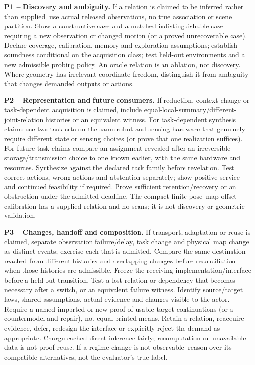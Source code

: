 \documentclass[11pt,letterpaper]{article}
\newcommand{\status}[1]{\textbf{#1.}}
\begin{document}
\status{P1 -- Discovery and ambiguity} If a relation is claimed to be inferred rather than supplied, use actual released observations, no true association or scene partition. Show a constructive case and a matched indistinguishable case requiring a new observation or changed motion (or a proved unrecoverable case). Declare coverage, calibration, memory and exploration assumptions; establish soundness conditional on the acquisition class; test held-out environments and a new admissible probing policy. An oracle relation is an ablation, not discovery. Where geometry has irrelevant coordinate freedom, distinguish it from ambiguity that changes demanded outputs or actions.

\status{P2 -- Representation and future consumers} If reduction, context change or task-dependent acquisition is claimed, include equal-local-summary/different-joint-relation histories or an equivalent witness. For task-dependent synthesis claims use two task sets on the same robot and sensing hardware that genuinely require different state or sensing choices (or prove that one realization suffices). For future-task claims compare an assignment revealed after an irreversible storage/transmission choice to one known earlier, with the same hardware and resources. Synthesize against the declared task family before revelation. Test correct actions, wrong actions and abstention separately; show positive service and continued feasibility if required. Prove sufficient retention/recovery or an obstruction under the admitted deadline. The compact finite pose--map offset calibration has a supplied relation and no scans; it is not discovery or geometric validation.

\status{P3 -- Changes, handoff and composition} If transport, adaptation or reuse is claimed, separate observation failure/delay, task change and physical map change as distinct events; exercise each that is admitted. Compare the same destination reached from different histories and overlapping changes before reconciliation when those histories are admissible. Freeze the receiving implementation/interface before a held-out transition. Test a lost relation or dependency that becomes necessary after a switch, or an equivalent failure witness. Identify source/target laws, shared assumptions, actual evidence and changes visible to the actor. Require a named imported or new proof of usable target continuations (or a countermodel and repair), not equal printed means. Retain a relation, reacquire evidence, defer, redesign the interface or explicitly reject the demand as appropriate. Charge cached direct inference fairly; recomputation on unavailable data is not proof reuse. If a regime change is not observable, reason over its compatible alternatives, not the evaluator's true label.
\end{document}
